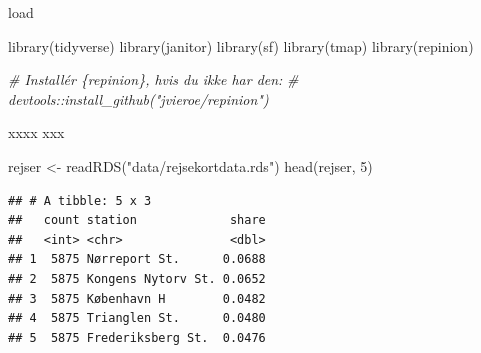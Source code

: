\documentclass[
  8pt,
  ignorenonframetext,
  aspectratio=169]{beamer}
\newenvironment{Shaded}{}{}
\newcommand{\CommentTok}[1]{\textcolor[rgb]{0.38,0.63,0.69}{\textit{#1}}}
\newcommand{\DecValTok}[1]{\textcolor[rgb]{0.25,0.63,0.44}{#1}}
\newcommand{\FunctionTok}[1]{\textcolor[rgb]{0.02,0.16,0.49}{#1}}
\newcommand{\NormalTok}[1]{#1}
\newcommand{\OtherTok}[1]{\textcolor[rgb]{0.00,0.44,0.13}{#1}}
\newcommand{\StringTok}[1]{\textcolor[rgb]{0.25,0.44,0.63}{#1}}
\begin{document}
\begin{frame}[fragile]{load}
\protect\hypertarget{load}{}
\begin{Shaded}
\begin{Highlighting}[]
\FunctionTok{library}\NormalTok{(tidyverse)}
\FunctionTok{library}\NormalTok{(janitor)}
\FunctionTok{library}\NormalTok{(sf)}
\FunctionTok{library}\NormalTok{(tmap)}
\FunctionTok{library}\NormalTok{(repinion)}

\CommentTok{\# Installér \{repinion\}, hvis du ikke har den:}
\CommentTok{\# devtools::install\_github("jvieroe/repinion")}
\end{Highlighting}
\end{Shaded}
\end{frame}

\begin{frame}[fragile]{xxxx}
\protect\hypertarget{xxxx}{}
xxx

\begin{Shaded}
\begin{Highlighting}[]
\NormalTok{rejser }\OtherTok{\textless{}{-}} \FunctionTok{readRDS}\NormalTok{(}\StringTok{"data/rejsekortdata.rds"}\NormalTok{)}
\FunctionTok{head}\NormalTok{(rejser, }\DecValTok{5}\NormalTok{)}
\end{Highlighting}
\end{Shaded}

\begin{verbatim}
## # A tibble: 5 x 3
##   count station             share
##   <int> <chr>               <dbl>
## 1  5875 Nørreport St.      0.0688
## 2  5875 Kongens Nytorv St. 0.0652
## 3  5875 København H        0.0482
## 4  5875 Trianglen St.      0.0480
## 5  5875 Frederiksberg St.  0.0476
\end{verbatim}
\end{frame}
\end{document}
